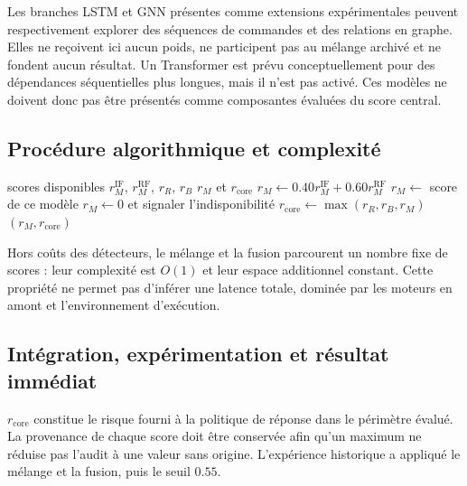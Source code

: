 \documentclass[11pt,a4paper,oneside]{report}
\theoremstyle{definition}
\theoremstyle{plain}
\begin{document}
Les branches LSTM et GNN présentes comme extensions expérimentales peuvent respectivement explorer des séquences de commandes et des relations en graphe. Elles ne reçoivent ici aucun poids, ne participent pas au mélange archivé et ne fondent aucun résultat. Un Transformer est prévu conceptuellement pour des dépendances séquentielles plus longues, mais il n'est pas activé. Ces modèles ne doivent donc pas être présentés comme composantes évaluées du score central.

\subsection*{Procédure algorithmique et complexité}

\begin{algorithm}[H]
\caption{Mélange appris et fusion conservatrice}
\label{alg:ai-ro-fusion}
\begin{algorithmic}[1]
\Require scores disponibles $r_M^{\mathrm{IF}}$, $r_M^{\mathrm{RF}}$, $r_R$, $r_B$
\Ensure $r_M$ et $r_{\mathrm{core}}$
  \State $r_M\leftarrow0.40r_M^{\mathrm{IF}}+0.60r_M^{\mathrm{RF}}$
  \State $r_M\leftarrow$ score de ce modèle
\Else
  \State $r_M\leftarrow0$ et signaler l'indisponibilité
\EndIf
\State $r_{\mathrm{core}}\leftarrow\max(r_R,r_B,r_M)$
\State \Return $(r_M,r_{\mathrm{core}})$
\end{algorithmic}
\end{algorithm}

Hors coûts des détecteurs, le mélange et la fusion parcourent un nombre fixe de scores : leur complexité est $O(1)$ et leur espace additionnel constant. Cette propriété ne permet pas d'inférer une latence totale, dominée par les moteurs en amont et l'environnement d'exécution.

\subsection*{Intégration, expérimentation et résultat immédiat}

$r_{\mathrm{core}}$ constitue le risque fourni à la politique de réponse dans le périmètre évalué. La provenance de chaque score doit être conservée afin qu'un maximum ne réduise pas l'audit à une valeur sans origine. L'expérience historique a appliqué le mélange et la fusion, puis le seuil $0.55$.

\begin{table}[H]
\centering
\caption{Résultat archivé de l'hybride IF--RF avec fusion maximale, $n=300$, seuil $0.55$.}
\label{tab:method-hybrid-results}
\small
{}
\end{table}
\end{document}
